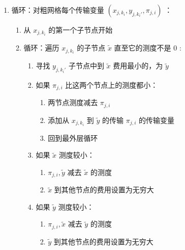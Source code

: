\documentclass[]{article}
\begin{document}
\begin{enumerate}
\def\labelenumi{\arabic{enumi}.}
\item
  循环：对粗网格每个传输变量 \((x_{j,k_i},y_{j,k_i'}, \pi_{j,i})\) ：

  \begin{enumerate}
  \def\labelenumii{\arabic{enumii}.}
  \item
    从 \(x_{j,k_i}\) 的第一个子节点开始
  \item
    循环：遍历 \(x_{j,k_i}\) 的子节点 \(\tilde{x}\) 直至它的测度不是
    \(0\) :

    \begin{enumerate}
    \def\labelenumiii{\arabic{enumiii}.}
    \item
      寻找 \(y_{j,k_i'}\) 子节点中到 \(\tilde{x}\) 费用最小的，为
      \(\tilde{y}\)
    \item
      如果 \(\pi_{j, i}\) 比这两个节点上的测度都小：

      \begin{enumerate}
      \def\labelenumiv{\arabic{enumiv}.}
      \item
        两节点测度减去 \(\pi_{j, i}\)
      \item
        添加从 \(x_{j,k_i}\) 到 \(\tilde{y}\) 的传输 \(\pi_{j,i}\)
        的传输变量
      \item
        回到最外层循环
      \end{enumerate}
    \item
      如果 \(\tilde{x}\) 测度较小：

      \begin{enumerate}
      \def\labelenumiv{\arabic{enumiv}.}
      \item
        \(\pi_{j,i}, \tilde{y}\) 减去 \(\tilde{x}\) 的测度
      \item
        \(\tilde{x}\) 到其他节点的费用设置为无穷大
      \end{enumerate}
    \item
      如果 \(\tilde{y}\) 测度较小：

      \begin{enumerate}
      \def\labelenumiv{\arabic{enumiv}.}
      \item
        \(\pi_{j,i}, \tilde{x}\) 减去 \(\tilde{y}\) 的测度
      \item
        \(\tilde{y}\) 到其他节点的费用设置为无穷大
      \end{enumerate}
    \end{enumerate}
  \end{enumerate}
\end{enumerate}
\end{document}
